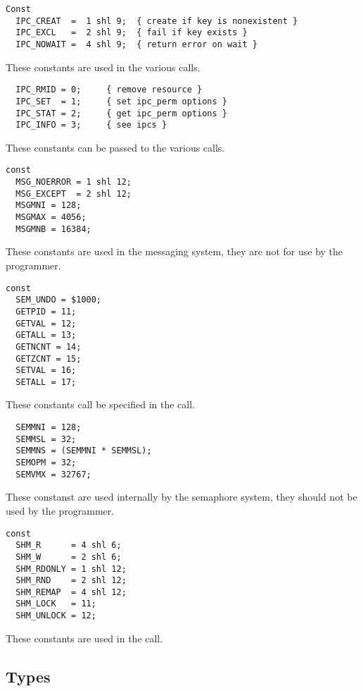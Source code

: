 \begin{verbatim}
Const 
  IPC_CREAT  =  1 shl 9;  { create if key is nonexistent }
  IPC_EXCL   =  2 shl 9;  { fail if key exists }
  IPC_NOWAIT =  4 shl 9;  { return error on wait }
\end{verbatim}
These constants are used in the various  calls.
\begin{verbatim}
  IPC_RMID = 0;     { remove resource }
  IPC_SET  = 1;     { set ipc_perm options }
  IPC_STAT = 2;     { get ipc_perm options }
  IPC_INFO = 3;     { see ipcs }
\end{verbatim}
These constants can be passed to the various  calls.
\begin{verbatim}
const
  MSG_NOERROR = 1 shl 12;
  MSG_EXCEPT  = 2 shl 12;
  MSGMNI = 128;
  MSGMAX = 4056;
  MSGMNB = 16384;
\end{verbatim}
These constants are used in the messaging system, they are not for use by
the programmer.
\begin{verbatim}
const
  SEM_UNDO = $1000;
  GETPID = 11;
  GETVAL = 12;
  GETALL = 13;
  GETNCNT = 14;
  GETZCNT = 15;
  SETVAL = 16;
  SETALL = 17;
\end{verbatim}
These constants call be specified in the  call.
\begin{verbatim}
  SEMMNI = 128;
  SEMMSL = 32;
  SEMMNS = (SEMMNI * SEMMSL);
  SEMOPM = 32;
  SEMVMX = 32767;
\end{verbatim}
These constanst are used internally by the semaphore system, they should not
be used by the programmer.
\begin{verbatim}
const
  SHM_R      = 4 shl 6;
  SHM_W      = 2 shl 6;
  SHM_RDONLY = 1 shl 12;
  SHM_RND    = 2 shl 12;
  SHM_REMAP  = 4 shl 12;
  SHM_LOCK   = 11;
  SHM_UNLOCK = 12;
\end{verbatim}
These constants are used in the  call.

\subsection{Types}

